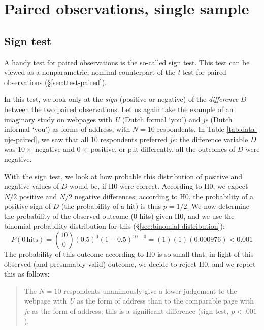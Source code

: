 \documentclass[
]{book}
\begin{document}
\hypertarget{paired-observations-single-sample}{%
\section{Paired observations, single sample}\label{paired-observations-single-sample}}

\hypertarget{sec:signtest}{%
\subsection{Sign test}\label{sec:signtest}}

A handy test for paired observations is the so-called sign test.
This test can be viewed as a nonparametric, nominal counterpart of
the \emph{t}-test for paired observations
(§\ref{sec:ttest-paired}).

In this test, we look only at the \emph{sign} (positive or negative)
of the \emph{difference} \(D\) between the two paired observations. Let us again
take the example of an imaginary study on webpages with
\emph{U} (Dutch formal `you') and \emph{je} (Dutch informal `you') as forms of address, with
\(N=10\) respondents. In Table \ref{tab:data-uje-paired}, we saw
that all 10 respondents preferred \emph{je}: the difference variable \(D\) was
\(10\times\) negative and \(0\times\) positive, or put differently, all the outcomes
of \(D\) were negative.

With the sign test, we look at how probable this distribution of positive and
negative values of \(D\) would be, if H0 were correct. According to
H0, we expect \(N/2\) positive and \(N/2\) negative differences; according to
H0, the probability of a positive sign of \(D\) (the probability of a hit) is thus
\(p=1/2\). We now determine the probability of the observed outcome (0 hits)
given H0, and we use the binomial probability distribution for this
(§\ref{sec:binomial-distribution}):
\begin{equation}
  \label{eq:prob-binom-uje}
    P(0\,\mbox{hits}) = {10 \choose 0} (0.5)^0 (1-0.5)^{10-0} = (1) (1) (0.000976) < 0.001
\end{equation}
The probability of this outcome according to H0 is so small that, in light of this
observed (and presumably valid) outcome, we decide to reject H0, and we report this as
follows:

\begin{quote}
The \(N=10\) respondents unanimously give a lower judgement to the
webpage with \emph{U} as the form of address than to the comparable page
with \emph{je} as the form of address; this is a significant difference
(sign test, \(p<.001\)).
\end{quote}
\end{document}
